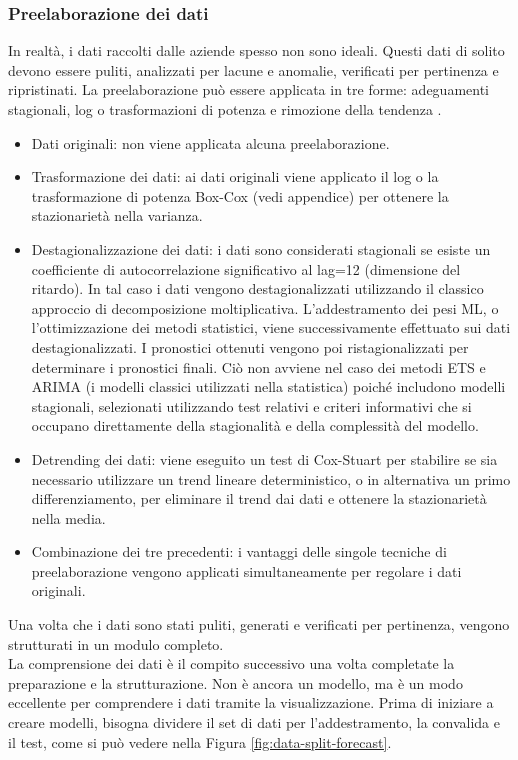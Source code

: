 \documentclass[12pt,a4paper]{report}
\begin{document}
\subsubsection{Preelaborazione dei dati}
In realtà, i dati raccolti dalle aziende spesso non sono ideali. Questi dati di solito devono essere puliti, analizzati per lacune e anomalie, verificati per pertinenza e ripristinati.
La preelaborazione può essere applicata in tre forme: adeguamenti stagionali, log o trasformazioni di potenza e rimozione della tendenza \cite{makridakis2018statistical}.
\begin{itemize}
    \item Dati originali: non viene applicata alcuna preelaborazione.
    \item Trasformazione dei dati: ai dati originali viene applicato il log o la trasformazione di potenza Box-Cox (vedi appendice) per ottenere la stazionarietà nella varianza.
    \item Destagionalizzazione dei dati: i dati sono considerati stagionali se esiste un coefficiente di autocorrelazione significativo al lag=12 (dimensione del ritardo). In tal caso i dati vengono destagionalizzati utilizzando il classico approccio di decomposizione moltiplicativa. L'addestramento dei pesi ML, o l'ottimizzazione dei metodi statistici, viene successivamente effettuato sui dati destagionalizzati. I pronostici ottenuti vengono poi ristagionalizzati per determinare i pronostici finali. Ciò non avviene nel caso dei metodi ETS e ARIMA (i modelli classici utilizzati nella statistica) poiché includono modelli stagionali, selezionati utilizzando test relativi e criteri informativi che si occupano direttamente della stagionalità e della complessità del modello.
    \item Detrending dei dati: viene eseguito un test di Cox-Stuart \cite{cox1955some} per stabilire se sia necessario utilizzare un trend lineare deterministico, o in alternativa un primo differenziamento, per eliminare il trend dai dati e ottenere la stazionarietà nella media.
    \item Combinazione dei tre precedenti: i vantaggi delle singole tecniche di preelaborazione vengono applicati simultaneamente per regolare i dati originali.
\end{itemize}

Una volta che i dati sono stati puliti, generati e verificati per pertinenza, vengono strutturati in un modulo completo.\\
La comprensione dei dati è il compito successivo una volta completate la preparazione e la strutturazione. Non è ancora un modello, ma è un modo eccellente per comprendere i dati tramite la visualizzazione. 
Prima di iniziare a creare modelli, bisogna dividere il set di dati per l'addestramento, la convalida e il test, come si può vedere nella Figura \ref{fig:data-split-forecast}.
\end{document}
